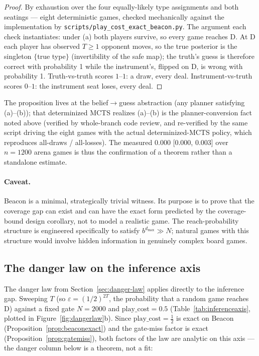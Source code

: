 \documentclass[11pt]{article}
\theoremstyle{remark}
\newcommand{\dmax}{d_{\max}}
\begin{document}
\begin{proof}
By exhaustion over the four equally-likely type assignments and both seatings --- eight deterministic games, checked mechanically against the implementation by \texttt{scripts/\allowbreak play\_\allowbreak cost\_\allowbreak exact\_\allowbreak beacon.py}. The argument each check instantiates: under (a) both players survive, so every game reaches D. At D each player has observed $T \geq 1$ opponent moves, so the true posterior is the singleton $\{$true type$\}$ (invertibility of the safe map); the truth's guess is therefore correct with probability 1 while the instrument's, flipped on D, is wrong with probability 1. Truth-vs-truth scores $1$--$1$: a draw, every deal. Instrument-vs-truth scores $0$--$1$: the instrument seat loses, every deal.
\end{proof}

The proposition lives at the belief$\to$guess abstraction (any planner satisfying (a)--(b)); that determinized MCTS realizes (a)--(b) is the planner-conversion fact noted above (verified by whole-branch code review, and re-verified by the same script driving the eight games with the actual determinized-MCTS policy, which reproduces all-draws / all-losses). The measured 0.000 [0.000, 0.003] over $n = 1200$ arena games is thus the confirmation of a theorem rather than a standalone estimate.

\paragraph{Caveat.} Beacon is a minimal, strategically trivial witness. Its purpose is to prove that the coverage gap can exist and can have the exact form predicted by the coverage-bound design corollary, not to model a realistic game. The reach-probability structure is engineered specifically to satisfy $b^{\dmax} \gg N$; natural games with this structure would involve hidden information in genuinely complex board games.

\subsection{The danger law on the inference axis}

The danger law from Section~\ref{sec:danger-law} applies directly to the inference gap. Sweeping $T$ (so $\varepsilon = (1/2)^{2T}$, the probability that a random game reaches D) against a fixed gate $N = 2000$ and $\mathrm{play\_cost} = 0.5$ (Table~\ref{tab:inferenceaxis}, plotted in Figure~\ref{fig:dangerlaw}b). Since $\mathrm{play\_cost} = \tfrac12$ is exact on Beacon (Proposition~\ref{prop:beaconexact}) and the gate-miss factor is exact (Proposition~\ref{prop:gatemiss}), both factors of the law are analytic on this axis --- the danger column below is a theorem, not a fit:
\end{document}
